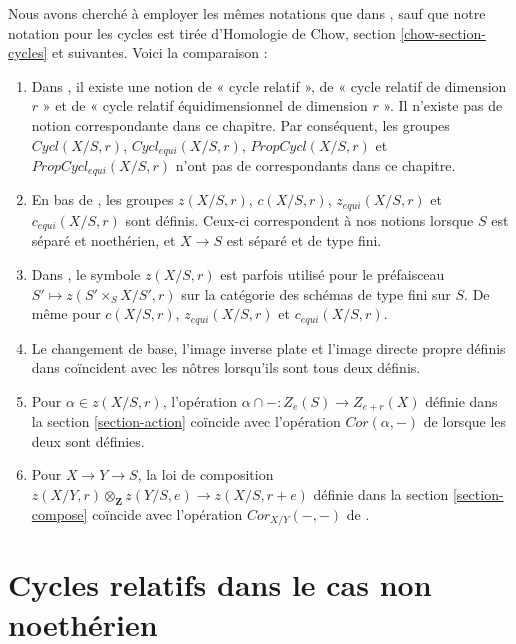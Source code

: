 \noindent
 Nous avons cherché à employer les mêmes notations que dans \cite{SV}, sauf que notre
 notation pour les cycles est tirée 
d'Homologie de Chow, section \ref{chow-section-cycles} et suivantes.
 Voici la comparaison : 
\begin{enumerate} 
\item Dans  \cite[Section 3.1]{SV} , il existe une notion
 de « cycle relatif », de « cycle relatif de dimension  $r$ » et 
de « cycle relatif équidimensionnel de dimension $r$ ». 
Il n'existe pas de notion correspondante dans ce chapitre. Par conséquent, les groupes  
$Cycl(X/S, r)$,  $Cycl_{equi}(X/S, r)$,  
$PropCycl(X/S, r)$ et  $PropCycl_{equi}(X/S, r)$ 
n'ont pas de correspondants dans ce chapitre. 
\item En bas de  \cite[page 36]{SV} , les groupes  
$z(X/S, r)$,  $c(X/S, r)$,  $z_{equi}(X/S, r)$ et $c_{equi}(X/S, r)$
  sont définis. Ceux-ci correspondent à nos notions lorsque $S$ est séparé et
 noethérien, et $X \to S$ est séparé et de type fini. 
\item Dans  \cite{SV} , le symbole  $z(X/S, r)$  est parfois utilisé pour le 
préfaisceau $S' \mapsto z(S' \times_S X/S', r)$  sur la catégorie des schémas
 de type fini sur  $S$. De même pour  
$c(X/S, r)$,  $z_{equi}(X/S, r)$ et  $c_{equi}(X/S, r)$. 
\item Le changement de base, l'image inverse plate et l'image directe 
propre définis dans \cite{SV} coïncident avec les nôtres lorsqu'ils sont tous deux définis. 
\item Pour $\alpha \in z(X/S, r)$, l'opération 
$\alpha \cap - : Z_e(S) \to Z_{e + r}(X)$ définie dans 
la section \ref{section-action} coïncide avec
 l'opération $Cor(\alpha, -)$ de \cite[Section 3.7]{SV} lorsque
 les deux sont définies. 
\item Pour $X \to Y \to S$, la loi de composition 
$z(X/Y, r) \otimes_\mathbf{Z} z(Y/S, e) \longrightarrow z(X/S, r + e)$
 définie dans la section \ref{section-compose}
 coïncide avec l'opération $Cor_{X/Y}(-, -)$ de 
\cite[Corollary 3.7.5]{SV}. 
\end{enumerate} 











\section{Cycles relatifs dans le cas non noethérien} 
\label{section-non-noetherian} 

